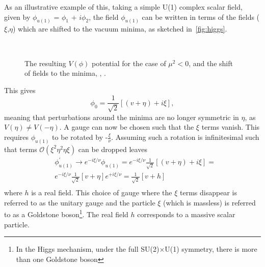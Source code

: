 As an illustrative example of this, taking a simple U(1) complex scalar field, given by $\phi_{u(1)}$ = $\phi_{1}$ + $i\phi_{2}$, the field $\phi_{u(1)}$ can be written in terms of the fields ($\xi$,$\eta$) which are shifted to the vacuum minima, as sketched in~\autoref{fig:higgs}.
\begin{figure}[ht!]
  \centering
  \\
           \caption{The resulting $V(\phi)$ potential for the case of $\mu^{2}<0$, \protect{}  and the shift of fields to the minima, \protect{}, \cite{higgs}.}
           \label{fig:higgs}
\end{figure}
This gives
\begin{equation}
  \phi_{0} = \frac{1}{\sqrt{2}}[(v+\eta) + i\xi],
  \end{equation}
meaning that perturbations around the minima are no longer symmetric in $\eta$, as $V(\eta)\neq V(-\eta)$.
A gauge can now be chosen such that the $\xi$ terms vanish.  This requires $\phi_{u(1)}$ to be rotated by -$\frac{\xi}{\nu}$. Assuming such a rotation is infinitesimal such that terms $\mathcal{O}(\xi^{2}\eta^{2}\eta\xi)$ can be dropped leaves
\begin{equation}
  \begin{split}
    &\phi^{'}_{u(1)} \to e^{-i\xi/\nu}\phi_{u(1)}  = e^{-i\xi/\nu}\frac{1}{\sqrt{2}}[(v+\eta) + i\xi] = \\
    & e^{-i\xi/\nu}\frac{1}{\sqrt{2}}[v+\eta]e^{+i\xi/\nu} = \frac{1}{\sqrt{2}}[v+h] \\
    \end{split}
\end{equation}
where $h$ is a real field. This choice of gauge where the $\xi$ terms disappear is referred to as the unitary gauge and the particle $\xi$ (which is massless) is referred to as a Goldstone boson\footnote{In the Higgs mechanism, under the full SU(2)$\times$U(1) symmetry, there is more than one Goldstone boson}. The real field $h$ corresponds to a massive scalar particle. %

